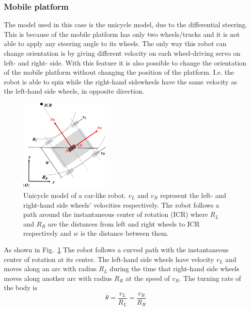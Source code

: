 \subsubsection{Mobile platform}
\label{subsubsec:unicycle}
The model used in this case is the unicycle model, due to the differential steering. 
This is because of the mobile platform has only two wheels/trucks and it is not able to apply any steering angle to its wheels. 
The only way this robot can change orientation is by giving different velocity on each wheel-driving servo on left- and right- side. 
With this feature it is also possible to change the orientation of the mobile platform without changing the position of the platform. 
I.e. the robot is able to spin while the right-hand sidewheels have the same velocity as the left-hand side wheels, in opposite direction.\\ 
\begin{figure}[h!]
\centering
\includegraphics[width=0.4\textwidth]{sections/assets/car-unicycle.png}
\caption{Unicycle model of a car-like robot. 
$v_L$ and $v_R$ represent the left- and right-hand side wheels' velocities respectively. 
The robot follows a path around the instantaneous center of rotation (ICR) where $R_L$ and $R_R$ are the distances from left and right wheels to ICR respectively and $w$ is the distance between them.}
\label{fig:UnicycleModel}
\end{figure} 

As shown in Fig.~\ref{fig:UnicycleModel} The robot follows a curved path with the instantaneous center of rotation at its center. 
The left-hand side wheels have velocity $v_L$ and moves along an arc with radius $R_L$ during the time that right-hand side wheels moves along another arc with radius $R_R$ at the speed of $v_R$. 
The turning rate of the body is
\begin{equation*}
\dot{\theta}= \frac{v_L}{R_L} = \frac{v_R}{R_R}
\end{equation*}

